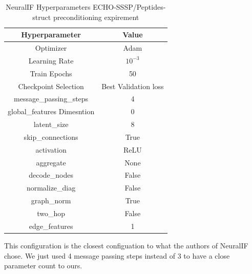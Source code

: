 \begin{table}[H]
    \centering
    \caption{NeuralIF Hyperparameters ECHO-SSSP/Peptides-struct preconditioning expirement}
    \small
    \begin{tabular}{c c}
        Hyperparameter              & Value                \\
        \hline
        Optimizer                   & Adam                 \\
        Learning Rate               & $10^{-3}$            \\
        Train Epochs                & 50                   \\
        Checkpoint Selection        & Best Validation loss \\
        message\_passing\_steps     & 4                    \\
        global\_features Dimesntion & 0                    \\
        latent\_size                & 8                    \\
        skip\_connections           & True                 \\
        activation                  & ReLU                 \\
        aggregate                   & None                 \\
        decode\_nodes               & False                \\
        normalize\_diag             & False                \\
        graph\_norm                 & True                 \\
        two\_hop                    & False                \\
        edge\_features              & 1
    \end{tabular}
\end{table}

This configuration is the closest configuation to what the authors of NeuralIF
\cite{hausnerNeuralIncompleteFactorization2024} chose. We just used 4 message
passing steps instead of 3 to have a close parameter count to ours.

